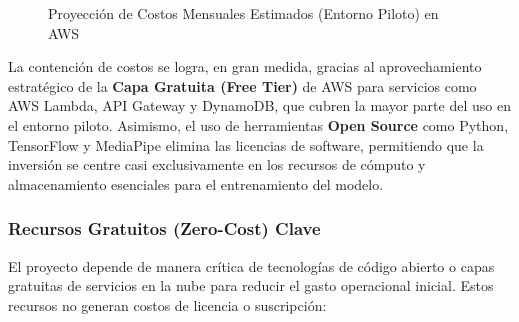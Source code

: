 \begin{figure}[H]
    \centering
    \caption{Proyección de Costos Mensuales Estimados (Entorno Piloto) en AWS}
    \label{fig:costo} %
\end{figure}

La contención de costos se logra, en gran medida, gracias al aprovechamiento estratégico de la \textbf{Capa Gratuita (Free Tier)} de AWS para servicios como AWS Lambda, API Gateway y DynamoDB, que cubren la mayor parte del uso en el entorno piloto. Asimismo, el uso de herramientas \textbf{Open Source} como Python, TensorFlow y MediaPipe elimina las licencias de software, permitiendo que la inversión se centre casi exclusivamente en los recursos de cómputo y almacenamiento esenciales para el entrenamiento del modelo.

\subsubsection*{Recursos Gratuitos (Zero-Cost) Clave}

El proyecto depende de manera crítica de tecnologías de código abierto o capas gratuitas de servicios en la nube para reducir el gasto operacional inicial. Estos recursos no generan costos de licencia o suscripción:

